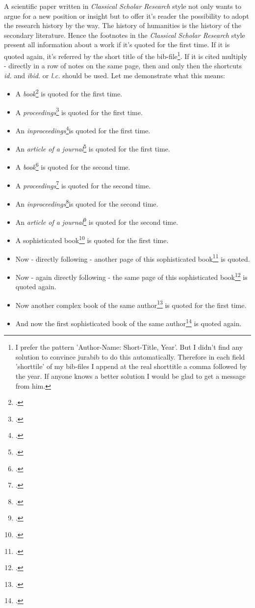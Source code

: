 \documentclass[DIV=calc,BCOR=5mm,11pt,headings=small,oneside,abstract=true, toc=bib]{scrartcl}
\begin{document}
A scientific paper written in \textit{Classical Scholar Research} style not only
wants to argue for a new position or insight but to offer it's reader
the possibility to adopt the research history by the way. The history of
humanities is the history of the secondary literature. Hence the footnotes in
the \textit{Classical Scholar Research} style present all information about a work
if it's quoted for the first time. If it is quoted again, it's referred by the
short title of the bib-file\footnote{I prefer the pattern 'Author-Name:
Short-Title, Year'. But I didn't find any solution to convince jurabib to do
this automatically. Therefore in each field 'shorttile' of my bib-files I append
at the real shorttitle a comma followed by the year. If anyone knows a better
solution I would be glad to get a message from him.}. If it is cited multiply -
directly in a row of notes on the same page, then and only then the shortcuts \textit{id.}
and \textit{ibid.} or \textit{l.c.} should be used. Let me demonstrate what
this means:

\begin{itemize}
  \item A \textit{book}\footcite[cf.][123]{AllHen2008a} is quoted for the first time.
  \item A \textit{proceedings}\footcite[cf.][234]{Brachman1985a} is quoted for the first time.
  \item An \textit{inproceedings}\footcite[cf.][345]{Hays1985a}is quoted for the first time.
  \item An \textit{article of a journal}\footcite[cf.][456]{McCarthy1980a} is quoted for
  the first time.
  \item A \textit{book}\footcite[cf.][123]{AllHen2008a} is quoted for the second time.
  \item A \textit{proceedings}\footcite[cf.][234]{Brachman1985a} is quoted for the second
  time.
  \item An \textit{inproceedings}\footcite[cf.][345]{Hays1985a}is quoted for the
  second time.
  \item An \textit{article of a journal}\footcite[cf.][456]{McCarthy1980a} is quoted for the second time.
  \item A sophisticated book\footcite[cf.][567]{KantKdV1974} is quoted for the first time.
  \item Now - directly following - another page of this sophisticated
  book\footcite[cf.][678]{KantKdV1974} is quoted.
  \item Now - again directly following - the same page of this sophisticated
  book\footcite[cf.][678]{KantKdV1974} is quoted again.
  \item Now another complex book of the same
  author\footcite[cf.][789]{KantKdU1974} is quoted for the first time.
  \item And now the first sophisticated book of the same
  author\footcite[cf.][789]{KantKdV1974} is quoted again.
\end{itemize}
\small



\printnomenclature


\end{document}
